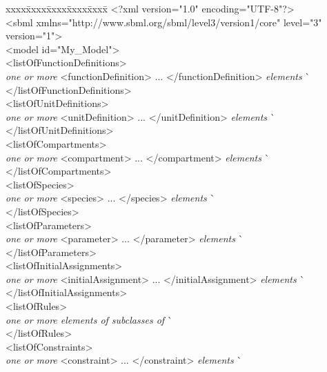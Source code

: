 \vspace*{1.5ex}
\begin{tt}
  \tightspacing
  \small
  \begin{tabbing}
xxxx\=xxxx\=xxxx\=xxxx\=xxxx\=\kill
\+\>
<?xml version="1.0" encoding="UTF-8"?>\\
<sbml xmlns="http://www.sbml.org/sbml/level3/version1/core" level="3" version="1">\\
\><model id="My\_Model">\\
\>\><listOfFunctionDefinitions>\\
\>\>\>\textrm{\emph{one or more}} <functionDefinition> ... </functionDefinition> \textrm{\emph{elements}}  \` \sayOptional\\
\>\></listOfFunctionDefinitions>\\
\>\><listOfUnitDefinitions>\\
\>\>\>\textrm{\emph{one or more}} <unitDefinition> ... </unitDefinition> \textrm{\emph{elements}}  \` \sayOptional\\
\>\></listOfUnitDefinitions>\\
\>\><listOfCompartments>\\
\>\>\>\textrm{\emph{one or more}} <compartment> ... </compartment> \textrm{\emph{elements}}  \` \sayOptional\\
\>\></listOfCompartments>\\
\>\><listOfSpecies>\\
\>\>\>\textrm{\emph{one or more}} <species> ... </species> \textrm{\emph{elements}}  \` \sayOptional\\
\>\></listOfSpecies>\\
\>\><listOfParameters>\\
\>\>\>\textrm{\emph{one or more}} <parameter> ... </parameter> \textrm{\emph{elements}}  \` \sayOptional\\
\>\></listOfParameters>\\
\>\><listOfInitialAssignments>\\
\>\>\>\textrm{\emph{one or more}} <initialAssignment> ... </initialAssignment> \textrm{\emph{elements}}  \` \sayOptional\\
\>\></listOfInitialAssignments>\\
\>\><listOfRules>\\
\>\>\>\textrm{\emph{one or more elements of subclasses of }}  \` \sayOptional\\
\>\></listOfRules>\\
\>\><listOfConstraints>\\
\>\>\>\textrm{\emph{one or more}} <constraint> ... </constraint> \textrm{\emph{elements}}  \` \sayOptional\\

\end{tabbing}
\end{tt}
